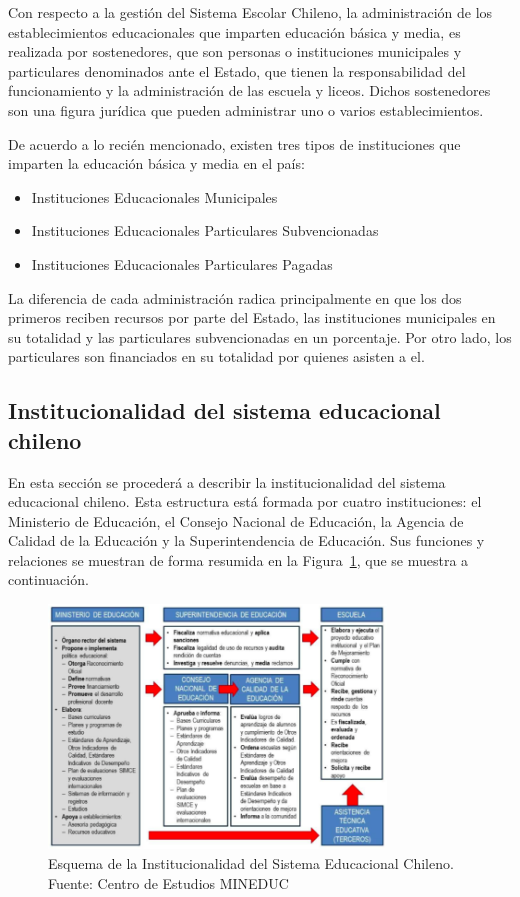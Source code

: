 Con respecto a la gestión del Sistema Escolar Chileno, la administración de los establecimientos educacionales que imparten educación básica y media, es realizada por sostenedores, que son personas o instituciones municipales y particulares denominados ante el Estado, que tienen la responsabilidad del funcionamiento y la administración de las escuela y liceos. Dichos sostenedores son una figura jurídica que pueden administrar uno o varios establecimientos. 

De acuerdo a lo recién mencionado, existen tres tipos de instituciones que imparten la educación básica y media en el país:

\begin{itemize}
\item Instituciones Educacionales Municipales
\item Instituciones Educacionales Particulares Subvencionadas
\item Instituciones Educacionales Particulares Pagadas
\end{itemize}

La diferencia de cada administración radica principalmente en que los dos primeros reciben recursos por parte del Estado, las instituciones municipales en su totalidad y las particulares subvencionadas en un porcentaje. Por otro lado, los particulares son financiados en su totalidad por quienes asisten a el. 


\subsection{Institucionalidad del sistema educacional chileno}
En esta sección se procederá a describir la institucionalidad del sistema educacional chileno. Esta estructura está formada por cuatro instituciones: el Ministerio de Educación, el Consejo Nacional de Educación, la Agencia de Calidad de la Educación y la Superintendencia de Educación. Sus funciones y relaciones se muestran de forma resumida en la Figura~\ref{fig:esquema}, que se muestra a continuación. 

\begin{figure}[H]
  \centering
    \includegraphics[width=0.8\textwidth]{Figuras/Institucionalidad}
      \caption{Esquema de la Institucionalidad del Sistema Educacional Chileno. Fuente: Centro de Estudios MINEDUC}
    \label{fig:esquema}
\end{figure}

